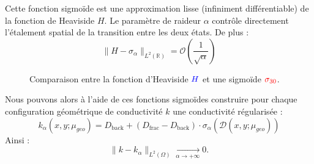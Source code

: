 \documentclass[12pt,a4paper]{article}
\begin{document}
Cette fonction sigmoïde est une approximation lisse (infiniment différentiable) de la fonction de Heaviside $H$. Le paramètre de raideur $\alpha$ contrôle directement l'étalement spatial de la transition entre les deux états. De plus :
\begin{equation*}
    \|H - \sigma_{\alpha}\|_{L^2(\mathbb{R})} = \mathcal{O}\left(\frac{1}{\sqrt{\alpha}}\right)
\end{equation*}

\begin{figure}[ht]
    \centering
    \caption{Comparaison entre la fonction d'Heaviside $\textcolor{blue}{H}$ et une sigmoïde $\textcolor{red}{\sigma_{30}}$.}

    \label{fig:heaviside_vs_sigmoide}
\end{figure}

Nous pouvons alors à l'aide de ces fonctions sigmoïdes construire pour chaque configuration géométrique de conductivité $k$ une conductivité régularisée :
\begin{equation*}
    k_{\alpha}(x, y; \mu_{geo}) = D_{\text{back}} + (D_{\text{frac}} - D_{\text{back}}) \cdot \sigma_{\alpha}(\mathcal{D}(x, y; \mu_{geo})) 
\end{equation*}
Ainsi :
\begin{equation*}
    \| k - k_{\alpha} \|_{L^2(\Omega)} \xrightarrow[\alpha \to +\infty]{} 0.
\end{equation*}
\end{document}

